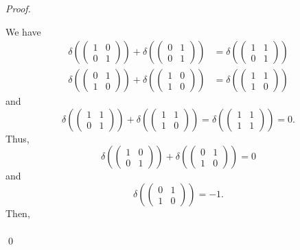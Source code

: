 \documentclass[12pt]{article}
\newenvironment{sol}
    {\emph{Proof.}
    }
    {
    \qed
    }
\begin{document}
\begin{sol}
We have \begin{align*}
    \delta \left( \begin{pmatrix}
    1 & 0 \\ 0 & 1
    \end{pmatrix} \right) + \delta \left( \begin{pmatrix}
    0 & 1 \\ 0 & 1
    \end{pmatrix} \right) &= \delta \left( \begin{pmatrix}
    1 & 1 \\ 0 & 1
    \end{pmatrix} \right) \\
    \delta \left( \begin{pmatrix}
    0 & 1 \\ 1 & 0
    \end{pmatrix} \right) + \delta \left( \begin{pmatrix}
    1 & 0 \\ 1 & 0
    \end{pmatrix} \right) &= \delta \left( \begin{pmatrix}
    1 & 1 \\ 1 & 0
    \end{pmatrix} \right)
\end{align*} and $$\delta \left( \begin{pmatrix}
    1 & 1 \\ 0 & 1
    \end{pmatrix} \right) + \delta \left( \begin{pmatrix}
    1 & 1 \\ 1 & 0
    \end{pmatrix} \right) = \delta \left( \begin{pmatrix}
    1 & 1 \\ 1 & 1
    \end{pmatrix} \right) = 0.$$Thus, $$\delta \left( \begin{pmatrix}
    1 & 0 \\ 0 & 1
    \end{pmatrix} \right) + \delta \left( \begin{pmatrix}
    0 & 1 \\ 1 & 0
    \end{pmatrix} \right) = 0$$and $$\delta \left( \begin{pmatrix}
    0 & 1 \\ 1 & 0
    \end{pmatrix} \right)=  -1.$$Then, \begin{align*}

\end{align*}
\end{sol}
\end{document}
